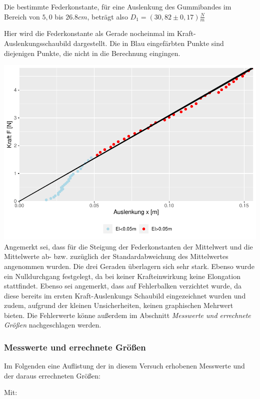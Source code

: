 \documentclass[class=article, crop=false]{standalone}
\begin{document}
Die bestimmte Federkonstante, für eine Auslenkung des Gummibandes im
Bereich von \(5,0\) bis \(26.8cm\), beträgt also
\(D_1=(30,82\pm 0,17)\frac{N}{m}\)

\newpage

Hier wird die Federkonstante als Gerade nocheinmal im
Kraft-Auslenkungsschaubild dargestellt. Die in Blau eingefärbten Punkte
sind diejenigen Punkte, die nicht in die Berechnung eingingen.

\includegraphics{DehnbareStoffe_files/figure-latex/unnamed-chunk-11-1.pdf}
Angemerkt sei, dass für die Steigung der Federkonstanten der Mittelwert
und die Mittelwerte ab- bzw. zuzüglich der Standardabweichung des
Mittelwertes angenommen wurden. Die drei Geraden überlagern sich sehr
stark. Ebenso wurde ein Nulldurchgang festgelegt, da bei keiner
Krafteinwirkung keine Elongation stattfindet. Ebenso sei angemerkt, dass
auf Fehlerbalken verzichtet wurde, da diese bereits im ersten
Kraft-Auslenkungs Schaubild eingezeichnet wurden und zudem, aufgrund der
kleinen Unsicherheiten, keinen graphischen Mehrwert bieten. Die
Fehlerwerte könne außerdem im Abschnitt
\textit{Messwerte und errechnete Größen} nachgeschlagen werden.

\hypertarget{messwerte-und-errechnete-gruxf6uxdfen}{%
\subsubsection{Messwerte und errechnete
Größen}\label{messwerte-und-errechnete-gruxf6uxdfen}}

Im Folgenden eine Auflistung der in diesem Versuch erhobenen Messwerte
und der daraus errechneten Größen:

Mit:
\end{document}
